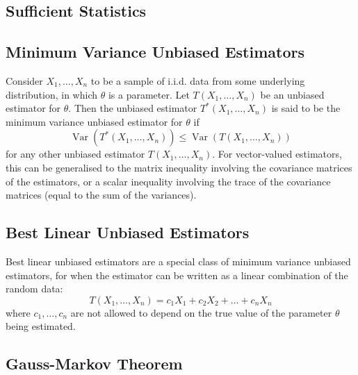 \documentclass[11pt]{report} %
\begin{document}
\subsection{Sufficient Statistics}

\subsection{Minimum Variance Unbiased Estimators}

Consider $X_{1}, \dots, X_{n}$ to be a sample of i.i.d. data from some underlying distribution, in which $\theta$ is a parameter. Let $T\left(X_{1}, \dots, X_{n}\right)$ be an unbiased estimator for $\theta$. Then the unbiased estimator $T^{*}\left(X_{1}, \dots, X_{n}\right)$ is said to be the minimum variance unbiased estimator for $\theta$ if
\begin{equation}
\operatorname{Var}\left(T^{*}\left(X_{1}, \dots, X_{n}\right)\right) \leq \operatorname{Var}\left(T\left(X_{1}, \dots, X_{n}\right)\right)
\end{equation}
for any other unbiased estimator $T\left(X_{1}, \dots, X_{n}\right)$. For vector-valued estimators, this can be generalised to the matrix inequality involving the covariance matrices of the estimators, or a scalar inequality involving the trace of the covariance matrices (equal to the sum of the variances).

\subsection{Best Linear Unbiased Estimators}

Best linear unbiased estimators are a special class of minimum variance unbiased estimators, for when the estimator can be written as a linear combination of the random data:
\begin{equation}
T\left(X_{1}, \dots, X_{n}\right) = c_{1}X_{1} + c_{2}X_{2} + \dots + c_{n}X_{n}
\end{equation}
where $c_{1}, \dots, c_{n}$ are not allowed to depend on the true value of the parameter $\theta$ being estimated.

\subsection{Gauss-Markov Theorem}
\end{document}
